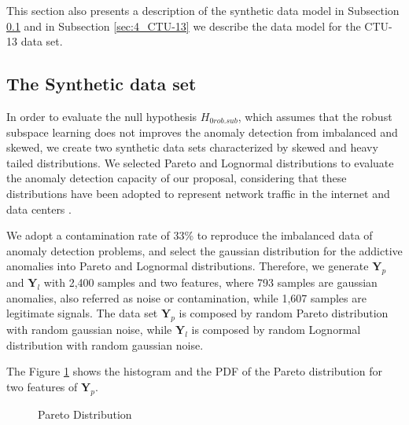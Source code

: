 This section also presents a description of the synthetic data model in Subsection \ref{sec:4_synthetic} and in Subsection \ref{sec:4_CTU-13} we describe the data model for the CTU-13 data set.

\subsection{The Synthetic data set}
\label{sec:4_synthetic}

In order to evaluate the null hypothesis $H_{0rob.sub}$, which assumes that the robust subspace learning does not improves the anomaly detection from imbalanced and skewed, we create two synthetic data sets characterized by skewed and heavy tailed distributions. We selected Pareto and Lognormal distributions to evaluate the anomaly detection capacity of our proposal, considering that these distributions have been adopted to represent network traffic in the internet and data centers \cite{benson2010network,leon2017probability}.

We adopt a contamination rate of 33\% to reproduce the imbalanced data of anomaly detection problems, and select the gaussian distribution for the addictive anomalies into Pareto and Lognormal distributions. Therefore, we generate $\boldsymbol{Y}_p$ and $\boldsymbol{Y}_l$ with 2,400 samples and two features, where 793 samples are gaussian anomalies, also referred as noise or contamination, while 1,607 samples are legitimate signals. The data set $\boldsymbol{Y}_p$ is composed by random Pareto distribution with random gaussian noise, while $\boldsymbol{Y}_l$ is composed by random Lognormal distribution with random gaussian noise.

The Figure \ref{fig:4.03} shows the histogram and the PDF of the Pareto distribution for two features of $\boldsymbol{Y}_p$.

\begin{figure}[!htb]
	\centering
	\caption[Pareto Distribution]{Pareto Distribution}
	\label{fig:4.03}
\end{figure}

